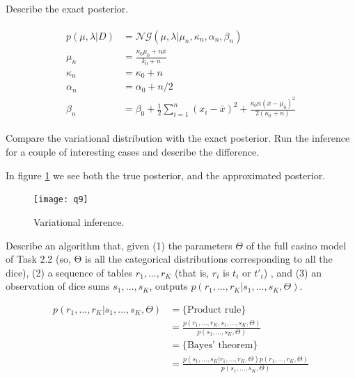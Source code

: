 \documentclass[12pt]{article}
\newenvironment{question}[2][Question]{\kern10pt \begin{trivlist}
\begin{tcolorbox}
\item[\hskip \labelsep {\bfseries #1}\hskip \labelsep {\bfseries #2.}]}
{\end{tcolorbox} \end{trivlist}}
\begin{document}
\begin{question}{8}
Describe the exact posterior.
\end{question}
\begin{align}
\begin{split}
p(\mu, \lambda \vert D) &= \mathcal{NG}(\mu, \lambda \vert \mu_n, \kappa_n, \alpha_n, \beta_n)
\\
\mu_n &= \frac{\kappa_0 \mu_0 + n \bar{x}}{k_0 + n}
\\
\kappa_n &= \kappa_0 + n
\\
\alpha_n &= \alpha_0 + n/2
\\
\beta_n &= \beta_0 + \frac{1}{2} \sum_{i=1}^{n} (x_i - \bar{x})^2 + \frac{\kappa_0 n (\bar{x} - \mu_0)^2}{2(\kappa_0 + n)}
\end{split}
\end{align}

\begin{question}{9}
Compare the variational distribution with the exact posterior. Run the inference
for a couple of interesting cases and describe the difference.
\end{question}

In figure \ref{q9} we see both the true posterior, and the approximated posterior.

\begin{figure}
\texttt{[image: q9]}
\centering
\caption{Variational inference.}
\label{q9}
\end{figure}

\begin{question}{10}
Describe an algorithm that, given (1) the parameters $\Theta$ of the full casino model of Task 2.2 (so, Θ is all the categorical distributions corresponding to all the dice), (2) a sequence of tables $r_1,...,r_K$ (that is, $r_i$ is $t_i$ or $t'_i$) , and (3) an observation of dice sums $s_1,..., s_K$, outputs
$p(r_1,..., r_K \vert s_1,..., s_K, \Theta)$.
\end{question}

\begin{equation}
\begin{split}
p(r_1,..., r_K \vert s_1,..., s_K, \Theta) &= \big\{ \text{Product rule} \big\} 
\\
&= \frac{p(r_1,...,r_K, s_1,...,s_K, \Theta)}{p(s_1,...,s_K, \Theta)}
\\
&= \big\{\text{Bayes' theorem}\big\}
\\
&= \frac{p(s_1,...,s_K \vert r_1,...,r_K, \Theta) p(r_1,...,r_K, \Theta)}{p(s_1,...,s_K, \Theta)}
\end{split}
\end{equation}
\end{document}
